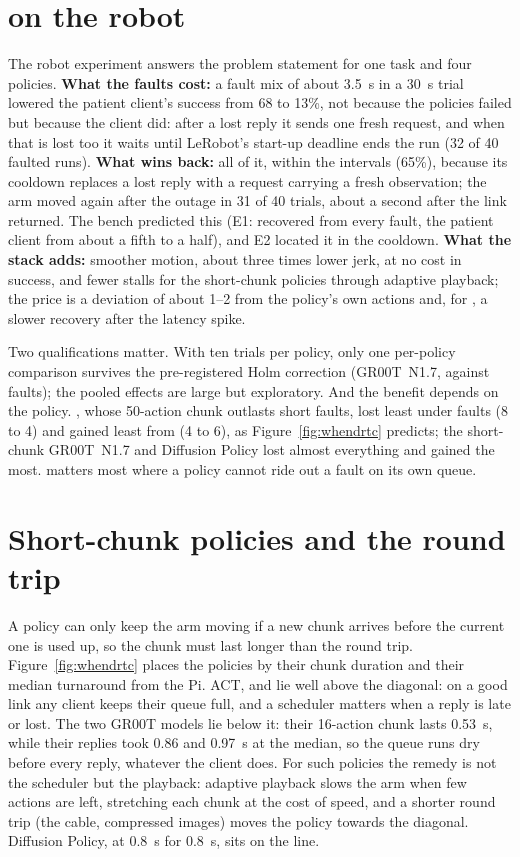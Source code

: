 \section{\drtc{} on the robot}
The robot experiment answers the problem statement for one task and four policies. \textbf{What the faults cost:} a
fault mix of about 3.5~s in a 30~s trial lowered the patient client's success from 68 to 13\%, not because the policies
failed but because the client did: after a lost reply it sends one fresh request, and when that is lost too it waits
until LeRobot's start-up deadline ends the run (32 of 40 faulted runs). \textbf{What \drtc{} wins back:} all of it,
within the intervals (65\%), because its cooldown replaces a lost reply with a request carrying a fresh observation;
the arm moved again after the outage in 31 of 40 trials, about a second after the link returned. The bench predicted
this (E1: \drtc{} recovered from every fault, the patient client from about a fifth
to a half), and E2 located it in the
cooldown. \textbf{What the stack adds:} smoother motion, about three times lower jerk, at no cost in success, and fewer
stalls for the short-chunk policies through adaptive playback; the price is a deviation of about 1--2\degree{} from the
policy's own actions and, for \pizerofive, a slower recovery after the latency spike.

Two qualifications matter. With ten trials per policy, only one per-policy comparison survives the pre-registered Holm
correction (GR00T~N1.7, \drtc{} against faults); the pooled effects are large but exploratory. And the benefit depends
on the policy. \pizerofive{}, whose 50-action chunk outlasts short faults, lost least under faults (8 to 4) and gained
least from \drtc{} (4 to 6), as Figure~\ref{fig:whendrtc} predicts; the short-chunk GR00T~N1.7 and Diffusion Policy
lost almost everything and gained the most. \drtc{} matters most where a policy cannot ride out a fault on its own
queue.

\section{Short-chunk policies and the round trip}\label{sec:shortchunk}
A policy can only keep the arm moving if a new chunk arrives before the current one is used up, so the chunk must last
longer than the round trip. Figure~\ref{fig:whendrtc} places the policies by their chunk duration and their median
turnaround from the Pi. ACT, \smolvla{} and \pizerofive{} lie well above the diagonal: on a good link any client keeps
their queue full, and a scheduler matters when a reply is late or lost. The two GR00T models lie below it: their
16-action chunk lasts 0.53~s, while their replies took 0.86 and 0.97~s at the median, so the queue runs dry before
every reply, whatever the client does. For such policies the remedy is not the scheduler but the playback: adaptive
playback slows the arm when few actions are left, stretching each chunk at the cost of speed, and a shorter round trip
(the cable, compressed images) moves the policy towards the diagonal. Diffusion Policy, at 0.8~s for 0.8~s, sits on
the line.


